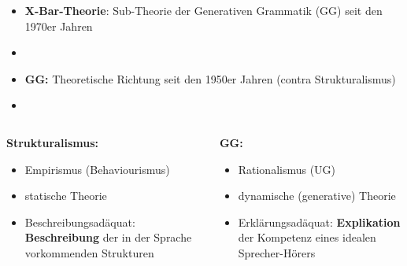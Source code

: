 \begin{frame}

\begin{itemize}

	\item \textbf{X-Bar-Theorie}: Sub-Theorie der Generativen Grammatik (GG) seit den 1970er Jahren \citep{Chomsky70a, Jackendoff77x}
	\item[]	
	\item \textbf{GG:} Theoretische Richtung seit den 1950er Jahren \citep{Chomsky57x} (contra Strukturalismus)
	\item[]
\end{itemize}

\begin{columns}
	
\begin{column}{.5\textwidth}

\textbf{Strukturalismus:}
\begin{itemize}
	\item Empirismus (Behaviourismus)
	\item statische Theorie
	\item Beschreibungsadäquat: \textbf{Beschreibung} der in der Sprache vorkommenden Strukturen
\end{itemize}

\end{column}	
\begin{column}{.5\textwidth}

\textbf{GG:}
\begin{itemize}
	\item Rationalismus (UG)
	\item dynamische (generative) Theorie
	\item Erklärungsadäquat: \textbf{Explikation} der Kompetenz eines idealen Sprecher-Hörers
\end{itemize}

\end{column}

\end{columns}

\end{frame}


